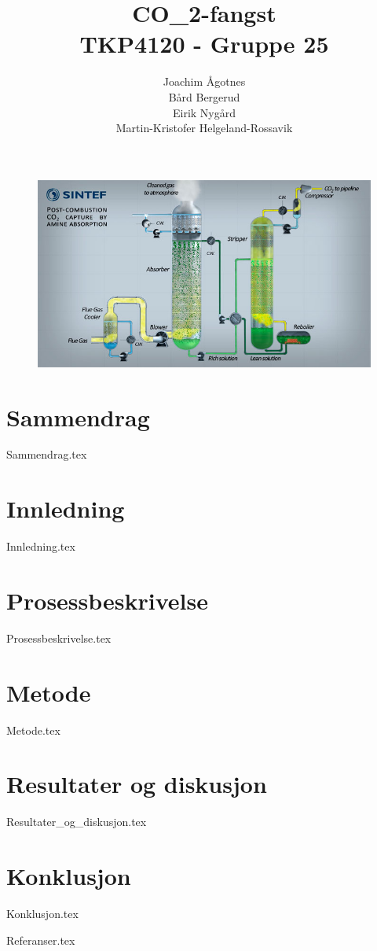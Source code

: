 \documentclass[12pt,  a4paper, twoside]{article}
\title{CO_2-fangst \\ TKP4120 - Gruppe 25}
\author{Joachim Ågotnes \\Bård Bergerud\\Eirik Nygård\\Martin-Kristofer Helgeland-Rossavik}
\date{}
\begin{document}
\maketitle
\begin{figure}[h]  
\includegraphics[scale=0.5]{Forsidebilde.jpg}
\centering
\end{figure}


\cleardoublepage

\section*{Sammendrag}
{Sammendrag.tex}

\newpage
\tableofcontents
\newpage


\section{Innledning}
{Innledning.tex}

\section{Prosessbeskrivelse}
{Prosessbeskrivelse.tex}

\section{Metode}
{Metode.tex}

\section{Resultater og diskusjon}
{Resultater_og_diskusjon.tex}

\section{Konklusjon}
{Konklusjon.tex}

{Referanser.tex}
\end{document}
